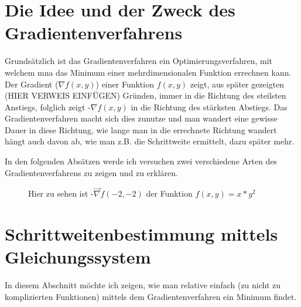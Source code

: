 \documentclass[a4paper, 11pt]{article}
\begin{document}



\tableofcontents

\newpage
\section{Die Idee und der Zweck des Gradientenverfahrens}

Grundsätzlich ist das Gradientenverfahren ein Optimierungsverfahren, mit welchem mna das Minimum einer mehrdimensionalen Funktion errechnen kann. Der Gradient (${\nabla}f(x,y)$) einer Funktion \(f(x,y)\) zeigt, aus später gezeigten (HIER VERWEIS EINFÜGEN) Gründen, immer in die Richtung des steilsten Anstiegs, folglich zeigt -${\nabla}f(x,y)$ in die Richtung des stärksten Abstiegs. Das Gradientenverfahren macht sich dies zunutze und man wandert eine gewisse Dauer in diese Richtung, wie lange man in die errechnete Richtung wandert hängt auch davon ab, wie man z.B. die Schrittweite ermittelt, dazu später mehr.

In den folgenden Absätzen werde ich versuchen zwei verschiedene Arten des Gradientenverfahrens zu zeigen und zu erklären.

\begin{figure}
\centering
{}
\caption[Gradientenvektor Beispiel]
{Hier zu sehen ist -$\vec{\nabla}f(-2,-2)$ der Funktion $f(x,y)=x*y^2$}
\end{figure}

\section{Schrittweitenbestimmung mittels Gleichungssystem}
In diesem Abschnitt möchte ich zeigen, wie man relative einfach (zu nicht zu komplizierten Funktionen) mittels dem Gradientenverfahren ein Minimum findet.
\end{document}
